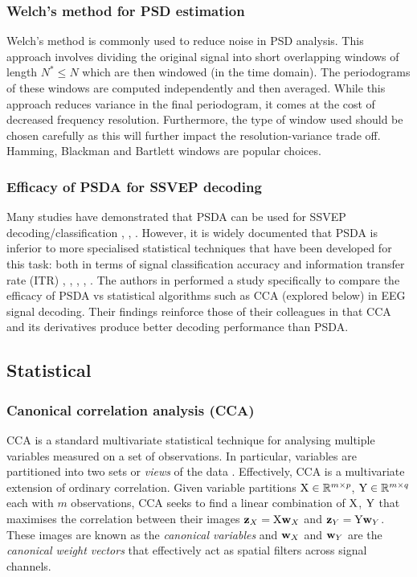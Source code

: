 \subsubsection{Welch's method for PSD estimation}
Welch's method is commonly used to reduce noise in PSD analysis. This approach involves dividing the original signal into short overlapping windows of length $N^* \leq N$ which are then windowed (in the time domain). The periodograms of these windows are computed independently and then averaged. While this approach reduces variance in the final periodogram, it comes at the cost of decreased frequency resolution. Furthermore, the type of window used should be chosen carefully as this will further impact the resolution-variance trade off. Hamming, Blackman and Bartlett windows are popular choices.

\subsubsection{Efficacy of PSDA for SSVEP decoding}
\label{subsection:psda-vs-cca}
Many studies have demonstrated that PSDA can be used for SSVEP decoding/classification \cite{zhao-stimulus-layout-effect}, \cite{bci-survey-nicolas-alonso}, \cite{acampora-dataset}. However, it is widely documented that PSDA is inferior to more specialised statistical techniques that have been developed for this task: both in terms of signal classification accuracy and information transfer rate (ITR) \cite{autthasan-single-chan-ssvep}, \cite{lin-cca-2006}, \cite{sun-gcca}, \cite{zhang-mset-cca}, \cite{hakvoort-cca-psda-comparison}. The authors in \cite{hakvoort-cca-psda-comparison} performed a study specifically to compare the efficacy of PSDA vs statistical algorithms such as CCA (explored below) in EEG signal decoding. Their findings reinforce those of their colleagues in that CCA and its derivatives produce better decoding performance than PSDA.

\subsection{Statistical}

\subsubsection{Canonical correlation analysis (CCA)}
\label{subsection:CCA-c2}
CCA is a standard multivariate statistical technique for analysing multiple variables measured on a set of observations. In particular, variables are partitioned into two sets or \textit{views} of the data \cite{cca-tutorial}. Effectively, CCA is a multivariate extension of ordinary correlation. Given variable partitions ${\textrm{X}} \in \mathbb{R}^{m\times p}$, ${\textrm{Y}} \in \mathbb{R}^{m\times q}$ each with $m$ observations, CCA seeks to find a linear combination of ${\textrm{X}}$, ${\textrm{Y}}$ that maximises the correlation between their images ${\mathbf{z}}_X = {\textrm{X}}{\mathbf{w}}_X$ and ${\mathbf{z}}_Y = {\textrm{Y}}{\mathbf{w}}_Y$. These images are known as the \textit{canonical variables} and ${\mathbf{w}}_X$ and ${\mathbf{w}}_Y$ are the \textit{canonical weight vectors} that effectively act as spatial filters across signal channels.

